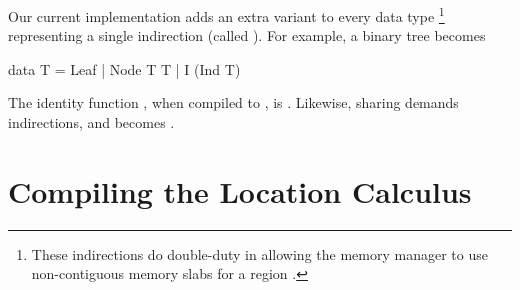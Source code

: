 Our current implementation adds an extra variant to every data type
\footnote{These indirections do double-duty in allowing the memory
  manager to use non-contiguous memory slabs for a region .}
representing a single indirection (called ).  For example, a binary tree
 becomes
\begin{code}
data T = Leaf | Node T T | I (Ind T)
\end{code}
%
The identity function , when compiled to \ourcalc, is .
Likewise, sharing demands indirections, and
becomes
.
%
%



\section{Compiling the Location Calculus} \label{sec:impl-local}

